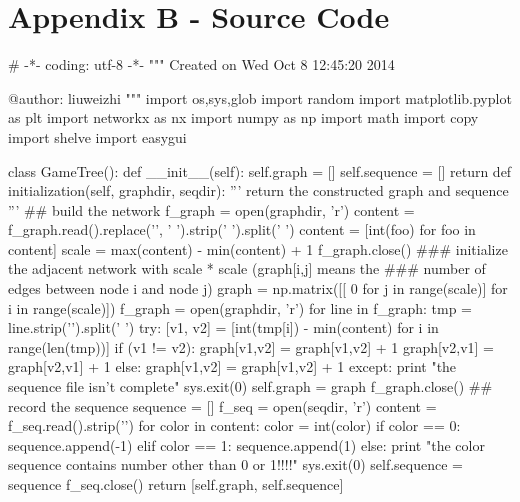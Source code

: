 \documentclass{article}
\begin{document}
\section*{Appendix B - Source Code}
\begin{python}[moreemph={[4]42},caption={A General Framework of MCTS based on Python},label=ex1]
# -*- coding: utf-8 -*-
"""
Created on Wed Oct  8 12:45:20 2014

@author: liuweizhi
"""
import os,sys,glob
import random
import matplotlib.pyplot as plt
import networkx as nx
import numpy as np
import math
import copy
import shelve
import easygui

class GameTree():
    def __init__(self):
        self.graph = []
        self.sequence = []
        return 
    def initialization(self, graphdir, seqdir):
        ''' return the constructed graph and sequence '''
        ## build the network
        f_graph = open(graphdir, 'r')
        content = f_graph.read().replace('\n', ' ').strip(' ').split(' ')
        content = [int(foo) for foo in content]
        scale =  max(content) - min(content) + 1
        f_graph.close()
        ### initialize the adjacent network with scale * scale (graph[i,j] means the
        ### number of edges between node i and node j)
        graph = np.matrix([[ 0 for j in range(scale)] for i in range(scale)])
        f_graph = open(graphdir, 'r')        
        for line in f_graph:
            tmp = line.strip('\n').split(' ')
            try:
                [v1, v2] = [int(tmp[i]) - min(content) for i in range(len(tmp))]
                if (v1 != v2):
                    graph[v1,v2] = graph[v1,v2] + 1
                    graph[v2,v1] = graph[v2,v1] + 1
                else:
                    graph[v1,v2] = graph[v1,v2] + 1
            except:
                print "the sequence file isn't complete"
                sys.exit(0)
        self.graph = graph                 
        f_graph.close()
        ## record the sequence
        sequence = []
        f_seq = open(seqdir, 'r')
        content = f_seq.read().strip('\n')
        for color in content:
            color = int(color)
            if color == 0:
                sequence.append(-1)
            elif color == 1:
                sequence.append(1)
            else:
                print "the color sequence contains number other than 0 or 1!!!!"
                sys.exit(0)
        self.sequence = sequence
        f_seq.close()
        return [self.graph, self.sequence]
  

\end{python}
\end{document}
